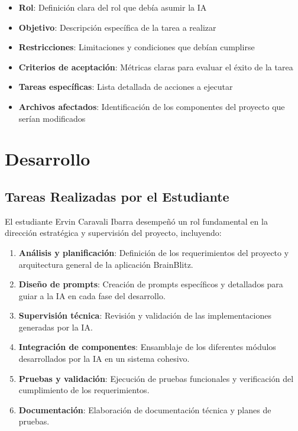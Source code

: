 \documentclass[12pt,a4paper]{article}
\begin{document}
\begin{itemize}
    \item \textbf{Rol}: Definición clara del rol que debía asumir la IA
    \item \textbf{Objetivo}: Descripción específica de la tarea a realizar
    \item \textbf{Restricciones}: Limitaciones y condiciones que debían cumplirse
    \item \textbf{Criterios de aceptación}: Métricas claras para evaluar el éxito de la tarea
    \item \textbf{Tareas específicas}: Lista detallada de acciones a ejecutar
    \item \textbf{Archivos afectados}: Identificación de los componentes del proyecto que serían modificados
\end{itemize}

\section{Desarrollo}

\subsection{Tareas Realizadas por el Estudiante}

El estudiante Ervin Caravali Ibarra desempeñó un rol fundamental en la dirección estratégica y supervisión del proyecto, incluyendo:

\begin{enumerate}
    \item \textbf{Análisis y planificación}: Definición de los requerimientos del proyecto y arquitectura general de la aplicación BrainBlitz.
    
    \item \textbf{Diseño de prompts}: Creación de prompts específicos y detallados para guiar a la IA en cada fase del desarrollo.
    
    \item \textbf{Supervisión técnica}: Revisión y validación de las implementaciones generadas por la IA.
    
    \item \textbf{Integración de componentes}: Ensamblaje de los diferentes módulos desarrollados por la IA en un sistema cohesivo.
    
    \item \textbf{Pruebas y validación}: Ejecución de pruebas funcionales y verificación del cumplimiento de los requerimientos.
    
    \item \textbf{Documentación}: Elaboración de documentación técnica y planes de pruebas.
\end{enumerate}
\end{document}
